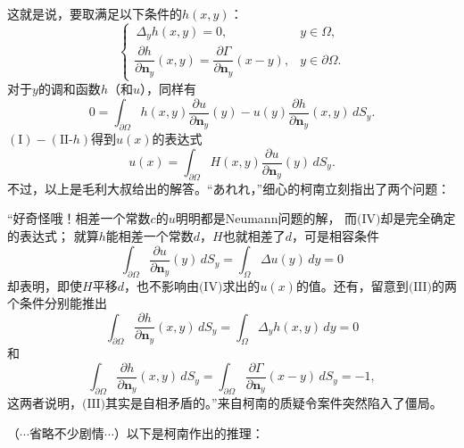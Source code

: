 \begin{itemize}
    这就是说，要取满足以下条件的$h(x,y)$：
    \begin{equation*}\tag{III}
    \begin{cases}
        \,\Delta_y h(x,y)=0,&y\in\varOmega,\\
        \dfrac{\partial h}{\partial\boldsymbol{n}_y}(x,y)
        =\dfrac{\partial\varGamma}{\partial\boldsymbol{n}_y}(x-y),&y\in\partial\varOmega.
    \end{cases}
    \end{equation*}
    对于$y$的调和函数$h$（和$u$），同样有
    \begin{equation*}\tag{II-$h$}
        0=\int_{\partial\varOmega}h(x,y)\frac{\partial u}{\partial\boldsymbol{n}_y}(y)
        -u(y)\frac{\partial h}{\partial\boldsymbol{n}_y}(x,y)\,dS_y.
    \end{equation*}
    $(\text{I})-(\text{II-}h)$得到$u(x)$的表达式
    \begin{equation*}\tag{IV}
        u(x)=\int_{\partial\varOmega}H(x,y)\frac{\partial u}{\partial\boldsymbol{n}_y}(y)\,dS_y.
    \end{equation*}
    不过，以上是毛利大叔给出的解答。``あれれ，''细心的柯南立刻指出了两个问题：
    
    ``好奇怪哦！相差一个常数$c$的$u$明明都是Neumann问题的解，
    而$\text{(IV)}$却是完全确定的表达式；
    就算$h$能相差一个常数$d$，$H$也就相差了$d$，可是相容条件
    \[\int_{\partial\varOmega}\frac{\partial u}{\partial\boldsymbol{n}_y}(y)\,dS_y
    =\int_\varOmega\Delta u(y)\,dy=0\]
    却表明，即使$H$平移$d$，也不影响由$\text{(IV)}$求出的$u(x)$的值。还有，留意到$\text{(III)}$的两个条件分别能推出
    \[\int_{\partial\varOmega}\frac{\partial h}{\partial\boldsymbol{n}_y}(x,y)\,dS_y
    =\int_\varOmega\Delta_yh(x,y)\,dy=0\]
    和
    \[\int_{\partial\varOmega}\frac{\partial h}{\partial\boldsymbol{n}_y}(x,y)\,dS_y
    =\int_{\partial\varOmega}\frac{\partial\varGamma}{\partial\boldsymbol{n}_y}(x-y)\,dS_y=-1,\]
    这两者说明，$\text{(III)}$其实是自相矛盾的。''来自柯南的质疑令案件突然陷入了僵局。
    
    （$\cdots$省略不少剧情$\cdots$）以下是柯南作出的推理：


\end{itemize}
